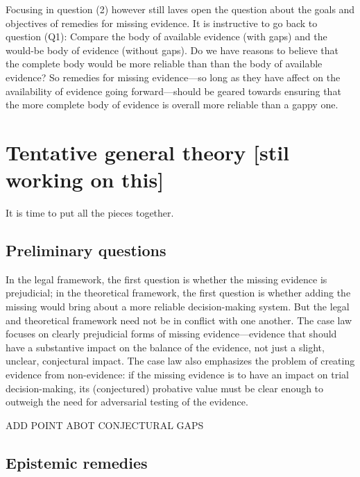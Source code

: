 \documentclass[
  10pt,
  dvipsnames,enabledeprecatedfontcommands]{scrartcl}
\begin{document}
Focusing in question (2) however still laves open the question about the
goals and objectives of remedies for missing evidence. It is instructive
to go back to question (Q1): Compare the body of available evidence
(with gaps) and the would-be body of evidence (without gaps). Do we have
reasons to believe that the complete body would be more reliable than
than the body of available evidence? So remedies for missing
evidence---so long as they have affect on the availability of evidence
going forward---should be geared towards ensuring that the more complete
body of evidence is overall more reliable than a gappy one.

\hypertarget{tentative-general-theory-stil-working-on-this}{%
\section{Tentative general theory {[}stil working on
this{]}}\label{tentative-general-theory-stil-working-on-this}}

It is time to put all the pieces together.

\hypertarget{preliminary-questions}{%
\subsection{Preliminary questions}\label{preliminary-questions}}

In the legal framework, the first question is whether the missing
evidence is prejudicial; in the theoretical framework, the first
question is whether adding the missing would bring about a more reliable
decision-making system. But the legal and theoretical framework need not
be in conflict with one another. The case law focuses on clearly
prejudicial forms of missing evidence---evidence that should have a
substantive impact on the balance of the evidence, not just a slight,
unclear, conjectural impact. The case law also emphasizes the problem of
creating evidence from non-evidence: if the missing evidence is to have
an impact on trial decision-making, its (conjectured) probative value
must be clear enough to outweigh the need for adversarial testing of the
evidence.

ADD POINT ABOT CONJECTURAL GAPS

\hypertarget{epistemic-remedies}{%
\subsection{Epistemic remedies}\label{epistemic-remedies}}
\end{document}
